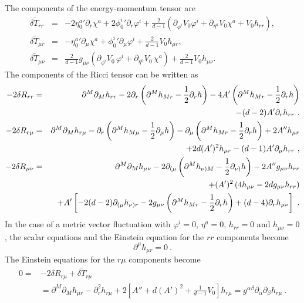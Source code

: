 The components of the energy-momentum tensor are
\begin{eqnarray}
	\delta \widetilde T_{rr} &=& -2{\eta_0^a}'\partial_r \chi^a+2{\phi_0^i}'\partial_r \varphi^i+\frac{2}{d-1}\left(\partial_{\phi^i} V_0 \varphi^i+\partial_{\eta^a} V_0 \chi^a+ V_0 h_{rr}\right),\\
	\delta \widetilde T_{\mu r} &=& -{\eta_0^a}' \partial_\mu\chi^a+{\phi^i_0}'\partial_\mu \varphi^i+\frac{2}{d-1}V_0 h_{\mu r},\\
	\delta \widetilde T_{\mu\nu} &=& \frac{2}{d-1}g_{\mu\nu} \left(\partial_{\phi^i} V_0\, \varphi^i+\partial_{\eta^a} V_0\, \chi^a\right)+\frac{2}{d-1}V_0 h_{\mu\nu}.
\end{eqnarray}
The components of the Ricci tensor can be written as
\begin{eqnarray}
 \notag   -2\delta R_{rr} &=&\partial^M\partial_M h_{rr}-2\partial_r\left(\partial^M h_{Mr}-\frac{1}{2}\partial_rh\right)-4 A'\left(\partial^M h_{Mr} -\frac{1}{2}\partial_r h\right)\\
	& & -(d-2)A' \partial_r h_{rr}\ .\\
 \notag    -2\delta R_{r\mu} &=& \partial^M\partial_M h_{r\mu}-\partial_r\left(\partial^M h_{M\mu}-\frac{1}{2}\partial_\mu h\right)-\partial_\mu\left(\partial^M h_{Mr}-\frac{1}{2}\partial_rh\right)+2 A'' h_{\mu r}
 \\
 & & + 2d(A')^2 h_{\mu r}-(d-1) A'\partial_\mu h_{rr}
 \ ,\\
\notag    -2\delta R_{\mu\nu} &=& \partial^M\partial_M h_{\mu\nu}-2\partial_{(\mu}\left(\partial^M  h_{\nu) M}-\frac{1}{2}\partial_{\nu)} h\right)-2 A'' g_{\mu\nu}h_{r r}\\
\notag & & +(A')^2\left(4 h_{\mu\nu}-2d g_{\mu\nu} h_{rr}\right)\\
 & & +A'\left[-2(d-2)\partial_{(\mu} h_{\nu)r}-2g_{\mu\nu} \left(\partial^M h_{Mr}-\frac{1}{2}\partial_r h\right)+(d-4)\partial_r h_{\mu\nu}\right]\ .
\end{eqnarray}
In the case of a metric vector fluctuation with $\varphi^i=0$, $\eta^a=0$, $h_{rr}=0$ and $h_{\mu\nu}=0$, the scalar equations and the Einstein equation for the $rr$ components become
\begin{equation}\label{eq:transvapp}
	\partial^\mu h_{\mu r}=0\ .
\end{equation}
The Einstein equations for the $r\mu$ components become
\begin{equation}
\begin{split}
0=& -2\delta R_{r\mu}+\delta \widetilde T_{r\mu}\\ &=\partial^M\partial_M h_{\mu r}-\partial_r^2 h_{r\mu}+2\left[A''+d(A')^2+\frac{1}{d-1} V_0\right] h_{r\mu}=g^{\alpha\beta}\partial_\alpha \partial_\beta h_{r\mu}\ .
\end{split}
\end{equation}
